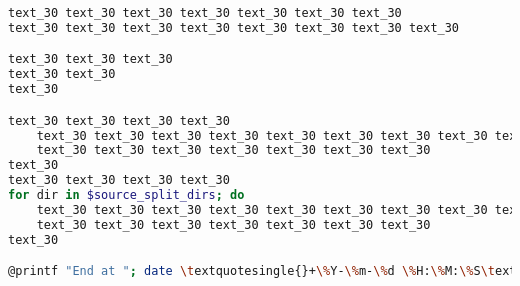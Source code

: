 \documentclass[9pt]{exam}
\begin{document}
\begin{questions}
\begin{lstlisting}[language=Bash, caption=Text 30 Text 30 Text 30 Text 30 Text 30]
text_30 text_30 text_30 text_30 text_30 text_30 text_30
text_30 text_30 text_30 text_30 text_30 text_30 text_30 text_30

text_30 text_30 text_30
text_30 text_30
text_30

text_30 text_30 text_30 text_30
    text_30 text_30 text_30 text_30 text_30 text_30 text_30 text_30 text_30 text_30
    text_30 text_30 text_30 text_30 text_30 text_30 text_30
text_30
text_30 text_30 text_30 text_30
for dir in $source_split_dirs; do
    text_30 text_30 text_30 text_30 text_30 text_30 text_30 text_30 text_30 text_30
    text_30 text_30 text_30 text_30 text_30 text_30 text_30
text_30

@printf "End at "; date \textquotesingle{}+\%Y-\%m-\%d \%H:\%M:\%S\textquotesingle{}@
\end{lstlisting}
    \makebox[0.9\textwidth]{\$ \enspace\hrulefill}\\\\
    \makebox[0.9\textwidth]{\enspace\hrulefill}\\\\
    \makebox[0.9\textwidth]{\enspace\hrulefill}\\\\
    \makebox[0.9\textwidth]{\enspace\hrulefill}

\end{questions}
\end{document}
